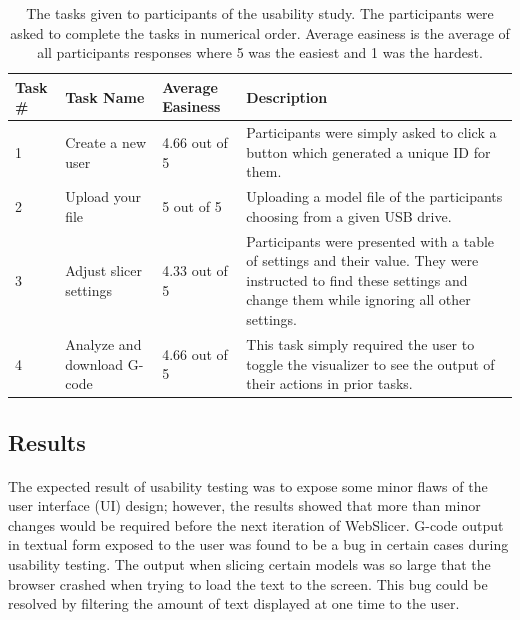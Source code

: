 \begin{table}[h]
  \centering
    \begin{tabularx}{\textwidth}{ |l|l|l|X| }
      \hline
      Task \# & Task Name & Average Easiness & Description \\ \hline
      \hline
      1 & Create a new user & 4.66 out of 5 & Participants were simply asked to click a button which generated a unique ID for them. \\ \hline
      2 & Upload your file & 5 out of 5 & Uploading a model file of the participants choosing from a given USB drive. \\ \hline
      3 & Adjust slicer settings & 4.33 out of 5 & Participants were presented with a table of settings and their value. They were instructed to find these settings and change them while ignoring all other settings. \\ \hline
      4 & Analyze and download G-code & 4.66 out of 5 & This task simply required the user to toggle the visualizer to see the output of their actions in prior tasks. \\ \hline
    \end{tabularx}
  \caption{The tasks given to participants of the usability study. The participants were asked to complete the tasks in numerical order. Average easiness is the average of all participants responses where 5 was the easiest and 1 was the hardest.}
  \label{tab:tasks}
\end{table}

\subsection{Results}
\paragraph{}
The expected result of usability testing was to expose some minor flaws of the user interface (UI) design; however, the results showed that more than minor changes would be required before the next iteration of WebSlicer.
G-code output in textual form exposed to the user was found to be a bug in certain cases during usability testing.
The output when slicing certain models was so large that the browser crashed when trying to load the text to the screen.
This bug could be resolved by filtering the amount of text displayed at one time to the user.

